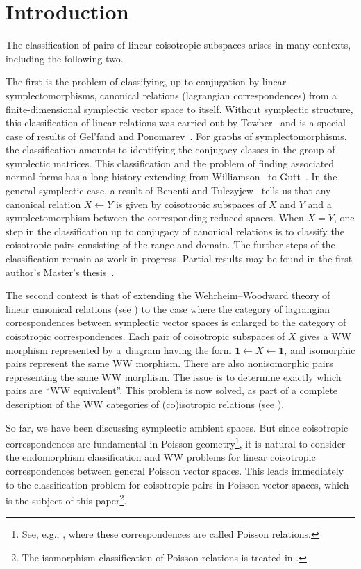 \documentclass[pdftex]{sigma}
\numberwithin{equation}{section}
\begin{document}
\section{Introduction}

The classif\/ication of pairs of linear coisotropic subspaces arises in many contexts, including the following two.

The f\/irst is the problem of classifying, up to conjugation by linear symplectomorphisms, canonical relations (lagrangian correspondences) from a f\/inite-dimensional symplectic vector space to itself.   Without symplectic structure, this
classif\/ication of linear relations was carried out by Towber~\cite{Towber} and is a special case of results of Gel'fand and Ponomarev~\cite{Gelfand_Ponomarev}.  For graphs of symplectomorphisms, the classif\/ication amounts to identifying the conjugacy classes in the group of symplectic matrices. This classif\/ication and the problem of f\/inding associated normal forms has a long history extending from Williamson~\cite{Williamson} to Gutt~\cite{Gutt}. In the general symplectic case, a result of Benenti and Tulczyjew~\cite[Proposizioni~4.4 \&~4.5]{Benenti_Tulczyjew} tells us that any canonical relation $X\leftarrow Y$ is given by coisotropic subspaces of $X$ and $Y$ and a symplectomorphism between the corresponding reduced spaces.  When $X = Y$, one step in the classif\/ication up to conjugacy of canonical relations is to classify the coisotropic pairs consisting of  the range and domain. The further steps of the classif\/ication remain as work in progress.   Partial results may be found in the f\/irst author's
Master's thesis~\cite{Lorand}.

The second context is that of extending the Wehrheim--Woodward theory of linear canonical relations (see \cite{Li-Bland_Weinstein,Weinstein}) to the case where the category of lagrangian correspondences between symplectic vector spaces is enlarged to the category of coisotropic correspondences.  Each pair of coisotropic subspaces of $X$ gives a WW morphism represented by a~diagram having the form
${\mathbf 1} \leftarrow X \leftarrow {\mathbf 1}$, and isomorphic pairs represent the same WW morphism. There are also nonisomorphic pairs representing the same WW morphism. The issue is to determine exactly which pairs are ``WW equivalent''.   This problem is now solved, as part of a complete description of the WW categories of (co)isotropic relations (see \cite{Weinstein2}).

So far, we have been discussing symplectic ambient spaces. But since co\-isotropic correspondences are fundamental in Poisson geometry\footnote{See, e.g., \cite{we:coisotropic}, where these correspondences are called Poisson relations.},
it is natural to consider the endomorphism classif\/ication and WW problems for linear coisotropic correspondences between general Poisson vector spaces.   This leads immediately to the classif\/ication problem for coisotropic pairs in Poisson vector spaces, which is the subject of this paper\footnote{The isomorphism classif\/ication of Poisson relations is treated in
\cite{lo-we:decomposition}.}.
\end{document}
